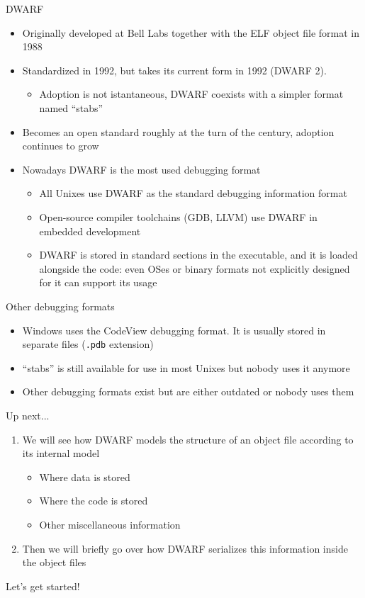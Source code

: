 \begin{frame}{DWARF}
\begin{itemize}
\item Originally developed at Bell Labs together with the ELF object file format in 1988
\item Standardized in 1992, but takes its current form in 1992 (DWARF 2).
	\begin{itemize}
	\item Adoption is not istantaneous, DWARF coexists with a simpler format named ``stabs''
	\end{itemize}
\item Becomes an open standard roughly at the turn of the century, adoption continues to grow
\item Nowadays DWARF is the most used debugging format
	\begin{itemize}
	\item All Unixes use DWARF as the standard debugging information format
	\item Open-source compiler toolchains (GDB, LLVM) use DWARF in embedded development
	\item DWARF is stored in standard sections in the executable, and it is loaded 
		alongside the code: even OSes or binary formats
		not explicitly designed for it can support its usage
	\end{itemize}
\end{itemize}
\end{frame}


\begin{frame}{Other debugging formats}
\begin{itemize}
\item Windows uses the CodeView debugging format. It is usually stored in separate files (\texttt{.pdb} extension)
\item ``stabs'' is still available for use in most Unixes but nobody uses it anymore
\item Other debugging formats exist but are either outdated or nobody uses them
\end{itemize}
\end{frame}


\begin{frame}{Up next...}
\begin{enumerate}
\item We will see \alert{how DWARF models the structure of an object file} according to its internal model
	\begin{itemize}
	\item Where data is stored
	\item Where the code is stored
	\item Other miscellaneous information
	\end{itemize}
\item Then we will briefly go over how \alert{DWARF serializes this information inside the object files}
\end{enumerate}
\bigskip
\centering Let's get started!\\

\end{frame}


